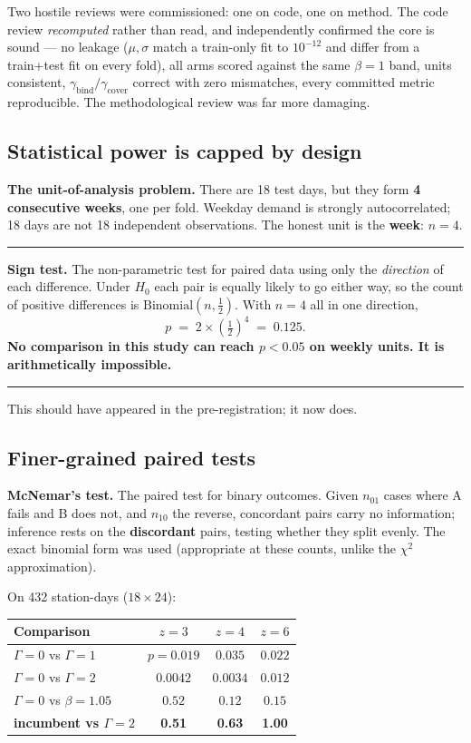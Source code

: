 \documentclass[11pt,a4paper]{article}
\newenvironment{keybox}
  {\par\medskip\noindent\rule{\linewidth}{0.9pt}\par\nobreak\smallskip\ignorespaces}
  {\par\smallskip\nobreak\noindent\rule{\linewidth}{0.9pt}\par\medskip}
\newcommand{\gbind}{\gamma_{\mathrm{bind}}}
\newcommand{\gcover}{\gamma_{\mathrm{cover}}}
\begin{document}
Two hostile reviews were commissioned: one on code, one on method. The code
review \emph{recomputed} rather than read, and independently confirmed the core
is sound --- no leakage ($\mu,\sigma$ match a train-only fit to $10^{-12}$ and
differ from a train+test fit on every fold), all arms scored against the same
$\beta=1$ band, units consistent, $\gbind/\gcover$ correct with zero
mismatches, every committed metric reproducible. The methodological review was
far more damaging.

\subsection{Statistical power is capped by design}

\textbf{The unit-of-analysis problem.} There are 18 test days, but they form
\textbf{4 consecutive weeks}, one per fold. Weekday demand is strongly
autocorrelated; 18 days are not 18 independent observations. The honest unit is
the \textbf{week}: $n=4$.

\begin{keybox}
\textbf{Sign test.} The non-parametric test for paired data using only the
\emph{direction} of each difference. Under $H_0$ each pair is equally likely to
go either way, so the count of positive differences is
$\mathrm{Binomial}(n,\tfrac12)$. With $n=4$ all in one direction,
\[
  p \;=\; 2\times\left(\tfrac12\right)^{4} \;=\; 0.125 .
\]
\textbf{No comparison in this study can reach $p<0.05$ on weekly units. It is
arithmetically impossible.}
\end{keybox}

This should have appeared in the pre-registration; it now does.

\subsection{Finer-grained paired tests}

\textbf{McNemar's test.} The paired test for binary outcomes. Given $n_{01}$
cases where A fails and B does not, and $n_{10}$ the reverse, concordant pairs
carry no information; inference rests on the \textbf{discordant} pairs, testing
whether they split evenly. The exact binomial form was used (appropriate at
these counts, unlike the $\chi^2$ approximation).

On 432 station-days ($18\times24$):

\begin{center}
\begin{tabular}{lccc}
\toprule
Comparison & $z=3$ & $z=4$ & $z=6$ \\
\midrule
$\Gamma=0$ vs $\Gamma=1$        & $p=0.019$  & $0.035$  & $0.022$ \\
$\Gamma=0$ vs $\Gamma=2$        & $0.0042$   & $0.0034$ & $0.012$ \\
$\Gamma=0$ vs $\beta{=}1.05$    & $0.52$     & $0.12$   & $0.15$  \\
\textbf{incumbent vs $\Gamma=2$}& \textbf{0.51} & \textbf{0.63} & \textbf{1.00} \\
\bottomrule
\end{tabular}
\end{center}
\end{document}
